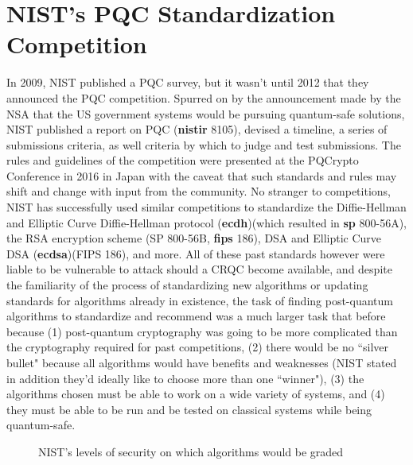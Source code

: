 \graphicspath{{Images/}}

\section{NIST's PQC Standardization Competition} \label{industry}
In 2009, NIST published a PQC survey, but it wasn't until 2012 that they announced the PQC competition. Spurred on by the announcement made by the NSA that the US government systems would be pursuing quantum-safe solutions, NIST published a report on PQC (\textbf{\gls{nistir}} 8105), devised a timeline, a series of submissions criteria, as well criteria by which to judge and test submissions. The rules and guidelines of the competition were presented at the PQCrypto Conference in 2016 in Japan with the caveat that such standards and rules may shift and change with input from the community. No stranger to competitions, NIST has successfully used similar competitions to standardize 
    the Diffie-Hellman and Elliptic Curve Diffie-Hellman protocol (\textbf{\gls{ecdh}})(which resulted in \textbf{\gls{sp}} 800-56A),
    the RSA encryption scheme (SP 800-56B, \textbf{\gls{fips}} 186),
    DSA and Elliptic Curve DSA (\textbf{\gls{ecdsa}})(FIPS 186), 
    and more.
All of these past standards however were liable to be vulnerable to attack should a CRQC become available, and despite the familiarity of the process of standardizing new algorithms or updating standards for algorithms already in existence, the task of finding post-quantum algorithms to standardize and recommend was a much larger task that before because 
    (1) post-quantum cryptography was going to be more complicated than the cryptography required for past competitions, 
    (2) there would be no ``silver bullet" because all algorithms would have benefits and weaknesses (NIST stated in addition they'd ideally like to choose more than one ``winner"), 
    (3) the algorithms chosen must be able to work on a wide variety of systems, and 
    (4) they must be able to be run and be tested on classical systems while being quantum-safe. 

\begin{figure}[h] 
    \centering
        {
            \captionsetup{justification=centering}
            \caption{NIST's levels of security on which algorithms would be graded}
            \label{fig:sec_levels}
        }
\end{figure}

